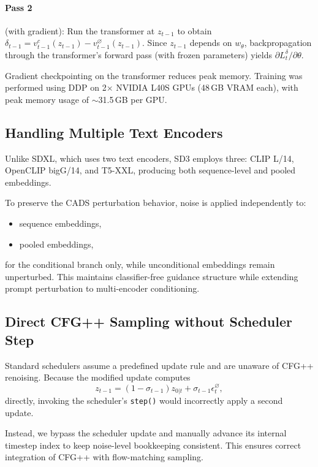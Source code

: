 \documentclass[acmtog]{acmart}
\begin{document}
\paragraph{Pass 2} (with gradient): Run the transformer at $z_{t-1}$ to obtain $\delta_{t-1} = v_{t-1}^{c}(z_{t-1}) - v_{t-1}^{\varnothing}(z_{t-1})$. Since $z_{t-1}$ depends on $w_\theta$, backpropagation through the transformer's forward pass (with frozen parameters) yields $\partial L_t^{\delta} / \partial \theta$.

Gradient checkpointing on the transformer reduces peak memory. Training was performed using DDP on 2$\times$ NVIDIA L40S GPUs (48\,GB VRAM each), with peak memory usage of $\sim$31.5\,GB per GPU.

\subsection{Handling Multiple Text Encoders}

Unlike SDXL, which uses two text encoders, SD3 employs three: CLIP L/14, OpenCLIP bigG/14, and T5-XXL, producing both sequence-level and pooled embeddings.

To preserve the CADS perturbation behavior, noise is applied independently to:
\begin{itemize}
\item sequence embeddings,
\item pooled embeddings,
\end{itemize}
for the conditional branch only, while unconditional embeddings remain unperturbed. This maintains classifier-free guidance structure while extending prompt perturbation to multi-encoder conditioning.

\subsection{Direct CFG++ Sampling without Scheduler Step}

Standard schedulers assume a predefined update rule and are unaware of CFG++ renoising.
Because the modified update computes
\begin{equation}
z_{t-1}
=
(1 - \sigma_{t-1}) z_{0|t}
+
\sigma_{t-1} \epsilon_t^{\varnothing},
\end{equation}
directly, invoking the scheduler's \texttt{step()} would incorrectly apply a second update.

Instead, we bypass the scheduler update and manually advance its internal timestep index to keep noise-level bookkeeping consistent. This ensures correct integration of CFG++ with flow-matching sampling.
\end{document}
